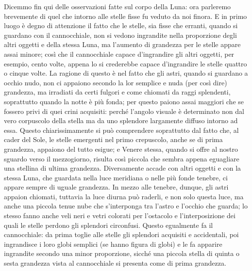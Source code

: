 \documentclass[11pt,twoside,openany]{book}
\begin{document}
Dicemmo fin qui delle osservazioni fatte sul corpo della Luna: ora parleremo brevemente di quel che intorno alle stelle fisse fu veduto da noi finora. E in primo luogo è degno di attenzione il fatto che le stelle, sia fisse che erranti, quando si guardano con il cannocchiale, non si vedono ingrandite nella proporzione degli altri oggetti e della stessa Luna, ma l'aumento di grandezza per le stelle appare assai minore; così che il cannocchiale capace d'ingrandire gli altri oggetti, per esempio, cento volte, appena lo si crederebbe capace d'ingrandire le stelle quattro o cinque volte. La ragione di questo è nel fatto che gli astri, quando si guardano a occhio nudo, non ci appaiono secondo la lor semplice e nuda (per così dire) grandezza, ma irradiati da certi fulgori e come chiomati da raggi splendenti, soprattutto quando la notte è più fonda; per questo paiono assai maggiori che se fossero privi di quei crini acquisiti: perché l'angolo visuale è determinato non dal vero corpuscolo della stella ma da uno splendore largamente diffuso intorno ad essa. Questo chiarissimamente si può comprendere soprattutto dal fatto che, al cader del Sole, le stelle emergenti nel primo crepuscolo, anche se di prima grandezza, appaiono del tutto esigue; e Venere stessa, quando si offre al nostro sguardo verso il mezzogiorno, risulta così piccola che sembra appena eguagliare una stellina di ultima grandezza. Diversamente accade con altri oggetti e con la stessa Luna, che guardata nella luce meridiana o nelle più fonde tenebre, ci appare sempre di uguale grandezza. In mezzo alle tenebre, dunque, gli astri appaion chiomati, tuttavia la luce diurna può raderli, e non solo questa luce, ma anche una piccola tenue nube che s'interponga tra l'astro e l'occhio che guarda; lo stesso fanno anche veli neri e vetri colorati per l'ostacolo e l'interposizione dei quali le stelle perdono gli splendori circonfusi. Questo egualmente fa il cannocchiale: da prima toglie alle stelle gli splendori acquisiti e accidentali, poi ingrandisce i loro globi semplici (se hanno figura di globi) e le fa apparire ingrandite secondo una minor proporzione, sicché una piccola stella di quinta o sesta grandezza vista al cannocchiale si presenta come di prima grandezza.
\end{document}
